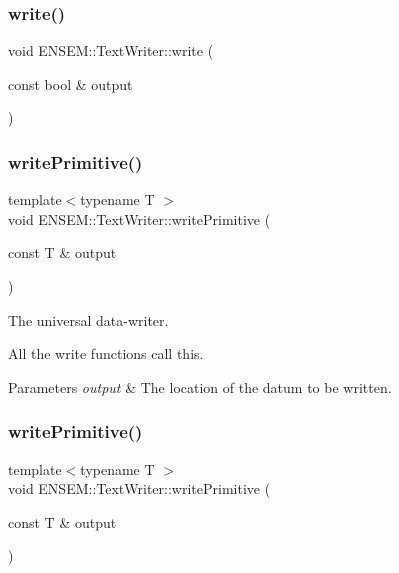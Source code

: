\subsubsection{\texorpdfstring{write()}{write()}\hspace{0.1cm}{\footnotesize\ttfamily [24/24]}}
{\footnotesize\ttfamily void E\+N\+S\+E\+M\+::\+Text\+Writer\+::write (\begin{DoxyParamCaption}\item[{const bool \&}]{output }\end{DoxyParamCaption})}

\mbox{\label{classENSEM_1_1TextWriter_aca159ff3db64ed918f7e4ddfed7a6d53}} 
\subsubsection{\texorpdfstring{writePrimitive()}{writePrimitive()}\hspace{0.1cm}{\footnotesize\ttfamily [1/2]}}
{\footnotesize\ttfamily template$<$typename T $>$ \\
void E\+N\+S\+E\+M\+::\+Text\+Writer\+::write\+Primitive (\begin{DoxyParamCaption}\item[{const T \&}]{output }\end{DoxyParamCaption})\hspace{0.3cm}{\ttfamily [protected]}}



The universal data-\/writer. 

All the write functions call this. 
\begin{DoxyParams}{Parameters}
{\em output} & The location of the datum to be written. \\
\hline
\end{DoxyParams}
\mbox{\label{classENSEM_1_1TextWriter_aca159ff3db64ed918f7e4ddfed7a6d53}} 
\subsubsection{\texorpdfstring{writePrimitive()}{writePrimitive()}\hspace{0.1cm}{\footnotesize\ttfamily [2/2]}}
{\footnotesize\ttfamily template$<$typename T $>$ \\
void E\+N\+S\+E\+M\+::\+Text\+Writer\+::write\+Primitive (\begin{DoxyParamCaption}\item[{const T \&}]{output }\end{DoxyParamCaption})\hspace{0.3cm}{\ttfamily [protected]}}



